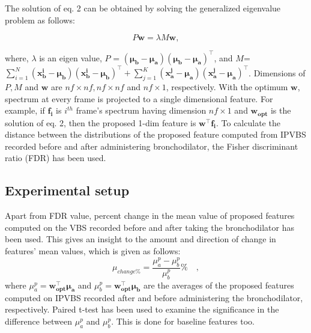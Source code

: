 \documentclass{article}
\begin{document}
The solution of eq. 2 can be obtained by solving the generalized eigenvalue problem \cite{ghojogh2019eigenvalue} as follows: 

\[P\boldsymbol{w} = {\lambda}M\boldsymbol{w} \tag{3} \label{eq:eigen},\]

where, \(\lambda\) is an eigen value, \(P\) = \((\boldsymbol{\mu_b-\mu_a})(\boldsymbol{\mu_b-\mu_a})^\intercal\), and \(M\)= \(\sum_{i=1}^{N} (\boldsymbol{x_b^i}-\boldsymbol{\mu_b})(\boldsymbol{x_b^i}-\boldsymbol{\mu_b})^\intercal+\sum_{j=1}^{K} (\boldsymbol{x_a^j}-\boldsymbol{\mu_a})(\boldsymbol{x_a^j}-\boldsymbol{\mu_a})^\intercal
\). 
Dimensions of $P, M$ and $\boldsymbol{w}$ are \(nf\times nf, nf\times nf \) and \( nf\times 1\), respectively.
With the optimum \(\boldsymbol{w}\), spectrum at every frame is projected to a single dimensional feature.
For example, if \(\boldsymbol{f_i}\) is $i^{th}$ frame's spectrum having dimension \( nf\times 1\) and \(\boldsymbol{w_{opt}}\) is the solution of eq. 2, then the proposed 1-dim feature is \(\boldsymbol{w^\intercal f_i}\). To calculate the distance between the distributions of the proposed feature computed from IPVBS recorded before and after administering bronchodilator, the Fisher discriminant ratio (FDR) \cite{kim2006robust} has been used.
\subsection{Experimental setup}

Apart from FDR value, percent change in the mean value of proposed features computed on the VBS recorded before and after taking the bronchodilator has been used. This gives an insight to the amount and direction of change in features' mean values, which is given as follows:
\begin{equation}
\mu_{change\%}=\frac{\mu_a^p-\mu_b^p}{\mu_b^p}\% \quad ,
\end{equation} 
where \(\mu_a^p=\boldsymbol{w_{opt}^\intercal \mu_a}\) 
and \(\mu_b^p=\boldsymbol{w_{opt}^\intercal \mu_b}\) are the averages of the proposed features computed on IPVBS recorded after and before administering the bronchodilator, respectively. Paired t-test \cite{tabata2018changes} has been used to examine the significance in the difference between \(\mu_a^p\) and \(\mu_b^p\). This is done for baseline features too.

\end{document}
